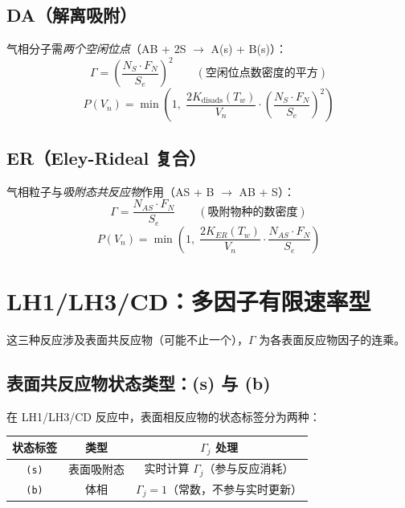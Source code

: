 \documentclass[12pt,a4paper]{article}
\begin{document}
\subsection{DA（解离吸附）}
气相分子需\emph{两个空闲位点}（AB + 2S $\to$ A(s) + B(s)）：
\begin{equation}
  \Gamma = \left(\frac{N_S \cdot F_N}{S_e}\right)^2 \qquad (\text{空闲位点数密度的平方})
\end{equation}
\begin{equation}
  P(V_n) = \min\!\left(1,\; \frac{2 K_{\text{disads}}(T_w)}{V_n} \cdot \left(\frac{N_S \cdot F_N}{S_e}\right)^2\right)
\end{equation}

\subsection{ER（Eley-Rideal 复合）}
气相粒子与\emph{吸附态共反应物}作用（AS + B $\to$ AB + S）：
\begin{equation}
  \Gamma = \frac{N_{AS} \cdot F_N}{S_e} \qquad (\text{吸附物种的数密度})
\end{equation}
\begin{equation}
  P(V_n) = \min\!\left(1,\; \frac{2 K_{ER}(T_w)}{V_n} \cdot \frac{N_{AS} \cdot F_N}{S_e}\right)
\end{equation}

\section{LH1/LH3/CD：多因子有限速率型}

这三种反应涉及表面共反应物（可能不止一个），$\Gamma$ 为各表面反应物因子的连乘。

\subsection{表面共反应物状态类型：(s) 与 (b)}

在 LH1/LH3/CD 反应中，表面相反应物的状态标签分为两种：

\begin{center}
\begin{tabular}{c|c|c}
\toprule
\textbf{状态标签} & \textbf{类型} & \textbf{$\Gamma_j$ 处理} \\
\midrule
\texttt{(s)} & 表面吸附态 & 实时计算 $\Gamma_j$（参与反应消耗）\\
\texttt{(b)} & 体相 & $\Gamma_j = 1$（常数，不参与实时更新）\\
\bottomrule
\end{tabular}
\end{center}
\end{document}
